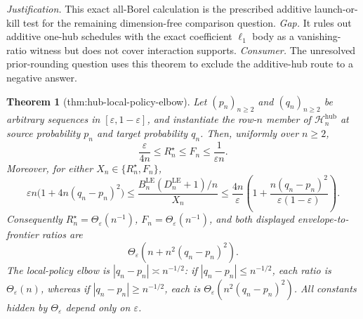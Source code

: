 \documentclass{article}
\newtheorem{theorem}{Theorem}
\begin{document}
\par\smallskip\noindent \textit{Justification.} This exact all-Borel calculation is the prescribed additive launch-or-kill test for the remaining dimension-free comparison question. \textit{Gap.} It rules out additive one-hub schedules with the exact coefficient \(\ell_1\) body as a vanishing-ratio witness but does not cover interaction supports. \textit{Consumer.} The unresolved prior-rounding question uses this theorem to exclude the additive-hub route to a negative answer.

\begin{theorem}[thm:hub-local-policy-elbow]\label{thm:hub-local-policy-elbow}
Let \((p_n)_{n\ge2}\) and \((q_n)_{n\ge2}\) be arbitrary sequences in \([\varepsilon,1-\varepsilon]\), and instantiate the row-\(n\) member of \(\mathcal H_n^{\mathrm{hub}}\) at source probability \(p_n\) and target probability \(q_n\).  Then, uniformly over \(n\ge2\),
\[
 \frac{\varepsilon}{4n}
 \le R_n^{\star}\le F_n\le\frac1{\varepsilon n}.
\]
Moreover, for either \(X_n\in\{R_n^{\star},F_n\}\),
\[
 \varepsilon n\bigl(1+4n(q_n-p_n)^2\bigr)
 \le
 \frac{B_n^{\mathrm{LE}}(D_n^{\mathrm{LE}}+1)/n}{X_n}
 \le
 \frac{4n}{\varepsilon}
 \left(1+\frac{n(q_n-p_n)^2}{\varepsilon(1-\varepsilon)}\right).
\]
Consequently \(R_n^{\star}=\Theta_{\varepsilon}(n^{-1})\), \(F_n=\Theta_{\varepsilon}(n^{-1})\), and both displayed envelope-to-frontier ratios are
\[
 \Theta_{\varepsilon}\!\left(n+n^2(q_n-p_n)^2\right).
\]
The local-policy elbow is \(|q_n-p_n|\asymp n^{-1/2}\): if \(|q_n-p_n|\le n^{-1/2}\), each ratio is \(\Theta_{\varepsilon}(n)\), whereas if \(|q_n-p_n|\ge n^{-1/2}\), each is \(\Theta_{\varepsilon}(n^2(q_n-p_n)^2)\).  All constants hidden by \(\Theta_{\varepsilon}\) depend only on \(\varepsilon\).
\end{theorem}
\end{document}
